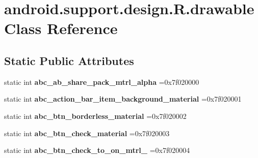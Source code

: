 \hypertarget{classandroid_1_1support_1_1design_1_1R_1_1drawable}{}\section{android.\+support.\+design.\+R.\+drawable Class Reference}
\label{classandroid_1_1support_1_1design_1_1R_1_1drawable}
\subsection*{Static Public Attributes}
\begin{DoxyCompactItemize}
\item 
\mbox{\label{classandroid_1_1support_1_1design_1_1R_1_1drawable_a0baad1aa1a239833079ddb15de08e7bd}} 
static int {\bfseries abc\+\_\+ab\+\_\+share\+\_\+pack\+\_\+mtrl\+\_\+alpha} =0x7f020000
\item 
\mbox{\label{classandroid_1_1support_1_1design_1_1R_1_1drawable_a3d734a94167d2b672dcf8465816ae807}} 
static int {\bfseries abc\+\_\+action\+\_\+bar\+\_\+item\+\_\+background\+\_\+material} =0x7f020001
\item 
\mbox{\label{classandroid_1_1support_1_1design_1_1R_1_1drawable_ae8f92d163ab3b47db23c86d9a07646f0}} 
static int {\bfseries abc\+\_\+btn\+\_\+borderless\+\_\+material} =0x7f020002
\item 
\mbox{\label{classandroid_1_1support_1_1design_1_1R_1_1drawable_ab4fad4bfdadffdb307d839a09abb83db}} 
static int {\bfseries abc\+\_\+btn\+\_\+check\+\_\+material} =0x7f020003
\item 
\mbox{\label{classandroid_1_1support_1_1design_1_1R_1_1drawable_ace50252e0d27ea69642fe6991fe1dbc5}} 
static int {\bfseries abc\+\_\+btn\+\_\+check\+\_\+to\+\_\+on\+\_\+mtrl\+\_} =0x7f020004
\item 
\mbox{\label{classandroid_1_1support_1_1design_1_1R_1_1drawable_ae86c3f977b45032574cd07c17ec674c1}} 

\end{DoxyCompactItemize}
